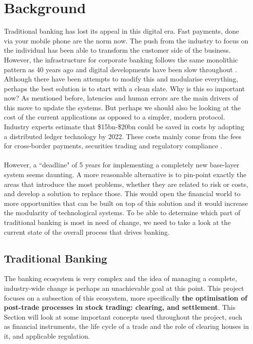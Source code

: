 \documentclass[12pt,twoside]{article}
\begin{document}
\section{Background}
\label{sec:Background}
Traditional banking has lost its appeal in this digital era. Fast payments, done via your mobile phone are the norm now. The push from the industry to focus on the individual has been able to transform the customer side of the business. However, the infrastructure for corporate banking follows the same monolithic pattern as 40 years ago and digital developments have been slow throughout \cite{slow}. Although there have been attempts to modify this and modularise everything, perhaps the best solution is to start with a clean slate. Why is this so important now? As mentioned before, latencies and human errors are the main drivers of this move to update the systems. But perhaps we should also be looking at the cost of the current applications as opposed to a simpler, modern protocol. Industry experts estimate that \$15bn-\$20bn could be saved in costs by adopting a distributed ledger technology by 2022. These costs mainly come from the fees for cross-border payments, securities trading and regulatory compliance \cite{Clearing:cost}.
\\ \\
However, a ``deadline" of 5 years for implementing a completely new base-layer system seems daunting. A more reasonable alternative is to pin-point exactly the areas that introduce the most problems, whether they are related to risk or costs, and develop a solution to replace those. This would open the financial world to more opportunities that can be built on top of this solution and it would increase the modularity of technological systems. To be able to determine which part of traditional banking is most in need of change, we need to take a look at the current state of the overall process that drives banking. 

\subsection{Traditional Banking}
\label{sub:TraditionalBanking}
The banking ecosystem is very complex and the idea of managing a complete, industry-wide change is perhaps an unachievable goal at this point. This project focuses on a subsection of this ecosystem, more specifically \textbf{the optimisation of post-trade processes in stock trading: clearing, and settlement}. This Section will look at some important concepts used throughout the project, such as financial instruments, the life cycle of a trade and the role of clearing houses in it, and applicable regulation.
\end{document}
